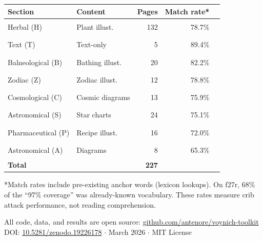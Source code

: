 \documentclass[11pt,a4paper]{article}
\begin{document}
\begin{tcolorbox}[title={\large Figure 6: Crib attack match rates across all 227 pages}]
\begin{center}
\renewcommand{\arraystretch}{1.4}
\begin{tabular}{llrrl}
\toprule
\textbf{Section} & \textbf{Content} & \textbf{Pages} & \textbf{Match rate*} & \\
\midrule
Herbal (H) & Plant illust. & 132 & 78.7\% & \rule{3.15cm}{8pt} \\
Text (T) & Text-only & 5 & 89.4\% & \rule{3.58cm}{8pt} \\
Balneological (B) & Bathing illust. & 20 & 82.2\% & \rule{3.29cm}{8pt} \\
Zodiac (Z) & Zodiac illust. & 12 & 78.8\% & \rule{3.15cm}{8pt} \\
Cosmological (C) & Cosmic diagrams & 13 & 75.9\% & \rule{3.04cm}{8pt} \\
Astronomical (S) & Star charts & 24 & 75.1\% & \rule{3.00cm}{8pt} \\
Pharmaceutical (P) & Recipe illust. & 16 & 72.0\% & \rule{2.88cm}{8pt} \\
Astronomical (A) & Diagrams & 8 & 65.3\% & \rule{2.61cm}{8pt} \\
\midrule
\textbf{Total} & & \textbf{227} & & \\
\bottomrule
\end{tabular}
\end{center}

\medskip\noindent\small
*Match rates include pre-existing anchor words (lexicon lookups).
On f27r, 68\% of the ``97\% coverage'' was already-known vocabulary.
These rates measure crib attack performance, not reading comprehension.
\end{tcolorbox}

\vfill

\begin{center}
\small\color{gray}
All code, data, and results are open source:
\href{https://github.com/antenore/voynich-toolkit}{github.com/antenore/voynich-toolkit}\\
DOI: \href{https://doi.org/10.5281/zenodo.19226178}{10.5281/zenodo.19226178}
$\cdot$ March 2026 $\cdot$ MIT License
\end{center}
\end{document}
